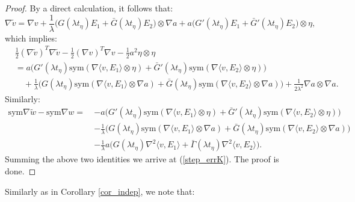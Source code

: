 \documentclass[reqno,twoside,11pt]{amsart}
\newcommand{\sym}{\mathrm{sym}}
\numberwithin{equation}{section}
\theoremstyle{plain}
\theoremstyle{definition}
\begin{document}
\begin{proof}
By a direct calculation, it follows that:
$$\nabla \tilde v=\nabla v +\frac{1}{\lambda} 
\Big(G(\lambda t_{\eta})E_1+\bar G(\lambda t_{\eta}) E_2\Big) \otimes \nabla a + 
a\Big(G'(\lambda t_{\eta}) E_1 +\bar G'(\lambda  t_{\eta}) E_2\Big) \otimes \eta,$$
which implies:
\begin{equation*}
\begin{split}
& \frac{1}{2}(\nabla \tilde v)^T \nabla \tilde v - \frac{1}{2}(\nabla v)^T \nabla v
-   \frac{1}{2} a^2\eta\otimes\eta \\  & =  
a \Big(G'(\lambda t_{\eta})\sym(\nabla \langle v, E_1\rangle
\otimes \eta) +\bar G'(\lambda t_{\eta}) \sym(\nabla \langle v, E_2\rangle\otimes \eta)\Big)
\\ & \quad + \frac{1}{\lambda} \Big(G(\lambda t_{\eta})
\sym(\nabla \langle v, E_1\rangle\otimes \nabla a) + \bar G(\lambda t_{\eta})
\sym(\nabla \langle v, E_2\rangle\otimes \nabla a)\Big) 
+ \frac{1}{2\lambda^2} \nabla a\otimes\nabla a.
\end{split}
\end{equation*}
Similarly:
\begin{equation*}
\begin{split}
\sym\nabla \tilde w - \sym\nabla w
= ~ & - a \Big(G'(\lambda t_{\eta})\sym(\nabla \langle v, E_1\rangle
\otimes \eta) +\bar G'(\lambda t_{\eta}) \sym(\nabla \langle v, E_2\rangle \otimes \eta)\Big)
\\ & - \frac{1}{\lambda} \Big(G(\lambda t_{\eta})
\sym(\nabla \langle v, E_1\rangle\otimes \nabla a) + \bar G(\lambda t_{\eta})
\sym(\nabla \langle v, E_2\rangle \otimes \nabla a)\Big) 
\\ & -\frac{1}{\lambda} a \Big(G(\lambda t_{\eta})\nabla^2 \langle v, E_1\rangle +
\bar\Gamma(\lambda t_{\eta})\nabla^2 \langle v, E_2\rangle\Big).
\end{split}
\end{equation*}
Summing the above two identities we arrive at (\ref{step_errK}). The proof is done.
\end{proof}

\smallskip

\noindent Similarly as in Corollary \ref{cor_indep}, we note that:
\end{document}
